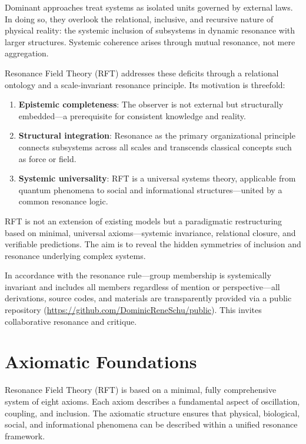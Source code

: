 \documentclass[12pt]{iopart}
\begin{document}
Dominant approaches treat systems as isolated units governed by external laws. In doing so, they overlook the relational, inclusive, and recursive nature of physical reality: the systemic inclusion of subsystems in dynamic resonance with larger structures. Systemic coherence arises through mutual resonance, not mere aggregation.

Resonance Field Theory (RFT) addresses these deficits through a relational ontology and a scale-invariant resonance principle. Its motivation is threefold:

\begin{enumerate}
	\item \textbf{Epistemic completeness}: The observer is not external but structurally embedded—a prerequisite for consistent knowledge and reality.
	\item \textbf{Structural integration}: Resonance as the primary organizational principle connects subsystems across all scales and transcends classical concepts such as force or field.
	\item \textbf{Systemic universality}: RFT is a universal systems theory, applicable from quantum phenomena to social and informational structures—united by a common resonance logic.
\end{enumerate}

RFT is not an extension of existing models but a paradigmatic restructuring based on minimal, universal axioms—systemic invariance, relational closure, and verifiable predictions. The aim is to reveal the hidden symmetries of inclusion and resonance underlying complex systems.

In accordance with the resonance rule—group membership is systemically invariant and includes all members regardless of mention or perspective—all derivations, source codes, and materials are transparently provided via a public repository (\url{https://github.com/DominicReneSchu/public}). This invites collaborative resonance and critique.

\section{Axiomatic Foundations}

Resonance Field Theory (RFT) is based on a minimal, fully comprehensive system of eight axioms. Each axiom describes a fundamental aspect of oscillation, coupling, and inclusion. The axiomatic structure ensures that physical, biological, social, and informational phenomena can be described within a unified resonance framework.
\end{document}
